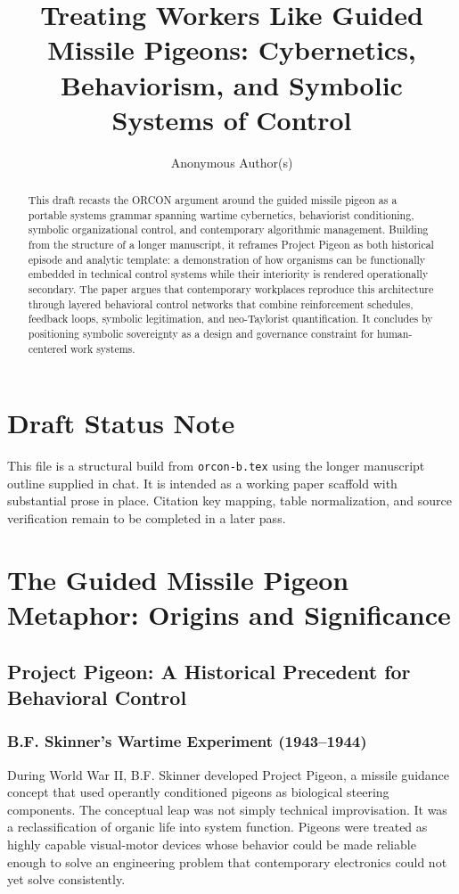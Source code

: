 \documentclass[11pt, a4paper]{article}
\title{Treating Workers Like Guided Missile Pigeons: Cybernetics, Behaviorism, and Symbolic Systems of Control}
\author{Anonymous Author(s)}
\affil{Working Draft (orcon-c) for HWID 2026 Development}
\date{}
\begin{document}
\maketitle

\begin{abstract}
This draft recasts the ORCON argument around the guided missile pigeon as a portable systems grammar spanning wartime cybernetics, behaviorist conditioning, symbolic organizational control, and contemporary algorithmic management. Building from the structure of a longer manuscript, it reframes Project Pigeon as both historical episode and analytic template: a demonstration of how organisms can be functionally embedded in technical control systems while their interiority is rendered operationally secondary. The paper argues that contemporary workplaces reproduce this architecture through layered behavioral control networks that combine reinforcement schedules, feedback loops, symbolic legitimation, and neo-Taylorist quantification. It concludes by positioning symbolic sovereignty as a design and governance constraint for human-centered work systems.
\end{abstract}

\section*{Draft Status Note}
This file is a structural build from \texttt{orcon-b.tex} using the longer manuscript outline supplied in chat. It is intended as a working paper scaffold with substantial prose in place. Citation key mapping, table normalization, and source verification remain to be completed in a later pass.

\section{The Guided Missile Pigeon Metaphor: Origins and Significance}

\subsection{Project Pigeon: A Historical Precedent for Behavioral Control}

\subsubsection{B.F. Skinner's Wartime Experiment (1943--1944)}
During World War II, B.F. Skinner developed Project Pigeon, a missile guidance concept that used operantly conditioned pigeons as biological steering components. The conceptual leap was not simply technical improvisation. It was a reclassification of organic life into system function. Pigeons were treated as highly capable visual-motor devices whose behavior could be made reliable enough to solve an engineering problem that contemporary electronics could not yet solve consistently.
\end{document}
